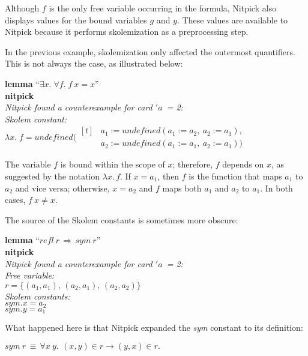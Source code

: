 \documentclass[a4paper,12pt]{article}
\def\undef{\textit{undefined}}
\begin{document}
Although $f$ is the only free variable occurring in the formula, Nitpick also
displays values for the bound variables $g$ and $y$. These values are available
to Nitpick because it performs skolemization as a preprocessing step.

In the previous example, skolemization only affected the outermost quantifiers.
This is not always the case, as illustrated below:

\prew
\textbf{lemma} ``$\exists x.\; \forall f.\; f~x = x$'' \\
\textbf{nitpick} \\[2\smallskipamount]
\slshape
Nitpick found a counterexample for \textit{card} $'a$~= 2: \\[2\smallskipamount]
\hbox{}\qquad Skolem constant: \nopagebreak \\
\hbox{}\qquad\qquad $\lambda x.\; f =
    \undef{}(\!\begin{aligned}[t]
    & a_1 := \undef{}(a_1 := a_2,\> a_2 := a_1), \\[-2pt]
    & a_2 := \undef{}(a_1 := a_1,\> a_2 := a_1))\end{aligned}$
\postw

The variable $f$ is bound within the scope of $x$; therefore, $f$ depends on
$x$, as suggested by the notation $\lambda x.\,f$. If $x = a_1$, then $f$ is the
function that maps $a_1$ to $a_2$ and vice versa; otherwise, $x = a_2$ and $f$
maps both $a_1$ and $a_2$ to $a_1$. In both cases, $f~x \not= x$.

The source of the Skolem constants is sometimes more obscure:

\prew
\textbf{lemma} ``$\mathit{refl}~r\,\Longrightarrow\, \mathit{sym}~r$'' \\
\textbf{nitpick} \\[2\smallskipamount]
\slshape
Nitpick found a counterexample for \textit{card} $'a$~= 2: \\[2\smallskipamount]
\hbox{}\qquad Free variable: \nopagebreak \\
\hbox{}\qquad\qquad $r = \{(a_1, a_1),\, (a_2, a_1),\, (a_2, a_2)\}$ \\
\hbox{}\qquad Skolem constants: \nopagebreak \\
\hbox{}\qquad\qquad $\mathit{sym}.x = a_2$ \\
\hbox{}\qquad\qquad $\mathit{sym}.y = a_1$
\postw

What happened here is that Nitpick expanded the \textit{sym} constant to its
definition:

\prew
$\mathit{sym}~r \,\equiv\,
 \forall x\> y.\,\> (x, y) \in r \longrightarrow (y, x) \in r.$
\postw
\end{document}
